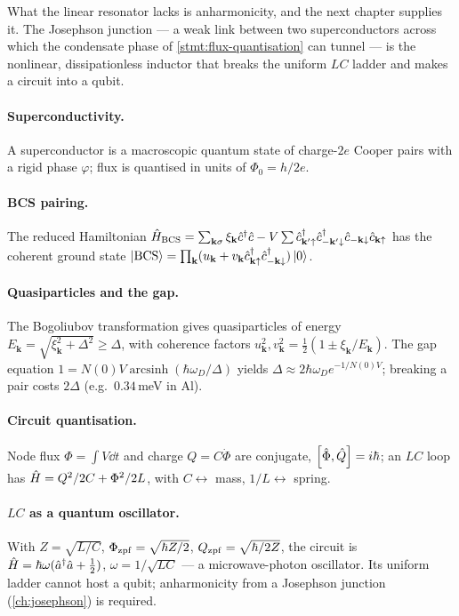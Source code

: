 What the linear resonator lacks is anharmonicity, and the next
chapter supplies it. The Josephson junction --- a weak link between
two superconductors across which the condensate phase of
\cref{stmt:flux-quantisation} can tunnel --- is the nonlinear,
dissipationless inductor that breaks the uniform $LC$ ladder and makes
a circuit into a qubit.

\clearpage
\begin{chaptersummary}

\paragraph{Superconductivity.}
A superconductor is a macroscopic quantum state of charge-$2e$ Cooper
pairs with a rigid phase $\varphi$; flux is quantised in units of
$\Phi_0=h/2e$.

\paragraph{BCS pairing.}
The reduced Hamiltonian
$\hat{H}_{\rm BCS}=\sum_{\mathbf k\sigma}\xi_{\mathbf k}\hat c^\dagger\hat c
-V\sum\hat c^\dagger_{\mathbf k'\uparrow}\hat c^\dagger_{-\mathbf k'\downarrow}
\hat c_{-\mathbf k\downarrow}\hat c_{\mathbf k\uparrow}$
has the coherent ground state
$\ket{\rm BCS}=\prod_{\mathbf k}(u_{\mathbf k}+v_{\mathbf k}
\hat c^\dagger_{\mathbf k\uparrow}\hat c^\dagger_{-\mathbf k\downarrow})\ket0$.

\paragraph{Quasiparticles and the gap.}
The Bogoliubov transformation gives quasiparticles of energy
$E_{\mathbf k}=\sqrt{\xi_{\mathbf k}^2+\Delta^2}\geq\Delta$, with
coherence factors
$u_{\mathbf k}^2,v_{\mathbf k}^2=\tfrac12(1\pm\xi_{\mathbf k}/E_{\mathbf k})$.
The gap equation $1=N(0)V\operatorname{arcsinh}(\hbar\omega_D/\Delta)$
yields $\Delta\approx2\hbar\omega_D e^{-1/N(0)V}$; breaking a pair
costs $2\Delta$ (e.g.\ $0.34\,$meV in Al).

\paragraph{Circuit quantisation.}
Node flux $\Phi=\int V\dd t$ and charge $Q=C\dot\Phi$ are conjugate,
$\comm{\op\Phi}{\op Q}=i\hbar$; an $LC$ loop has
$\hat{H}=Q^2/2C+\Phi^2/2L$, with $C\leftrightarrow$ mass,
$1/L\leftrightarrow$ spring.

\paragraph{$LC$ as a quantum oscillator.}
With $Z=\sqrt{L/C}$, $\Phi_{\rm zpf}=\sqrt{\hbar Z/2}$,
$Q_{\rm zpf}=\sqrt{\hbar/2Z}$, the circuit is
$\hat{H}=\hbar\omega(\hat a^\dagger\hat a+\tfrac12)$,
$\omega=1/\sqrt{LC}$ --- a microwave-photon oscillator. Its uniform
ladder cannot host a qubit; anharmonicity from a Josephson junction
(\cref{ch:josephson}) is required.

\end{chaptersummary}

